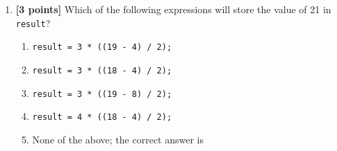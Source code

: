 \begin{enumerate}
\bigskip
\bigskip


\item {\bf [3 points]}
  Which of the following expressions will store the value of 21 in {\tt result}?
\begin{enumerate}
  \item {\tt result = 3 * ((19 - 4) / 2);}
\medskip 
  \item {\tt result = 3 * ((18 - 4) / 2);}
\medskip 
  \item {\tt result = 3 * ((19 - 8) / 2);}
\medskip
  \item {\tt result = 4 * ((18 - 4) / 2);}
\medskip
\item None of the above; the correct answer is \underline{\hspace{3in}}
\end{enumerate}


\bigskip
\bigskip

\end{enumerate}


